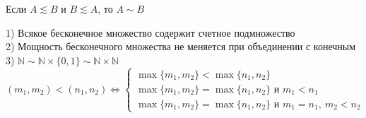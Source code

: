 \begin{theo}
Если $A \lesssim B$ и $B \lesssim A$, то $A \sim B$
\end{theo}
\begin{corol}
1) Всякое бесконечное множество содержит счетное подмножество\\
2) Мощность бесконечного множества не меняется при объединении с конечным\\
3) $\mathbb{N} \sim \mathbb{N} \times \{0,1\} \sim \mathbb{N} \times \mathbb{N}$\\
$$
	(m_1, m_2) < (n_1, n_2) \Leftrightarrow
	\begin{cases}
	\max\{m_1,m_2\} < \max\{n_1, n_2\}\\
	\max\{m_1,m_2\} = \max\{n_1, n_2\} \text{ и } m_1 < n_1\\
	\max\{m_1,m_2\} = \max\{n_1, n_2\} \text{ и } m_1 = n_1,\ m_2 < n_2
	\end{cases}
$$
\end{corol}

